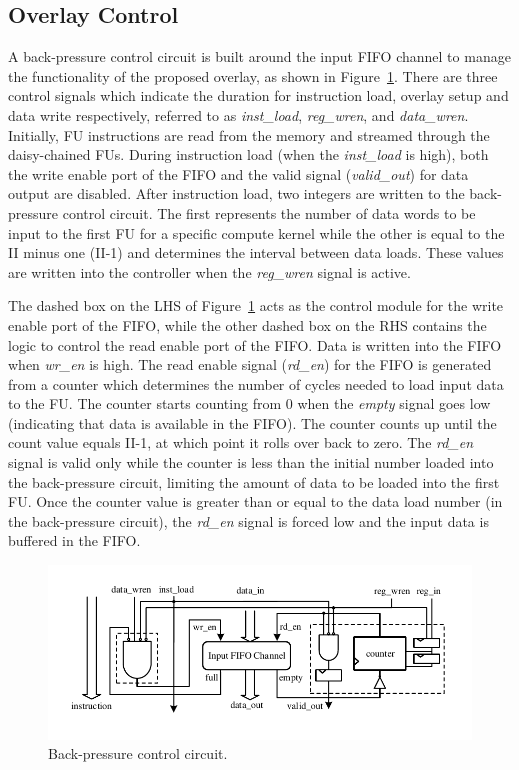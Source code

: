 \subsection{Overlay Control}
A back-pressure control circuit is built around the input FIFO channel to manage the functionality of the proposed overlay, as shown in Figure~\ref{back_pressure}. 
There are three control signals which indicate the duration for instruction load, overlay setup and data write respectively, referred to as \textit{inst\_load}, \textit{reg\_wren}, and \textit{data\_wren}. 
Initially, FU instructions are read from the memory and streamed through the daisy-chained FUs. 
During instruction load (when the \textit{inst\_load} is high), both the write enable port of the FIFO and the valid signal (\textit{valid\_out}) for data output are disabled. 
After instruction load, two integers are written to the back-pressure control circuit. 
The first represents the number of data words to be input to the first FU for a specific compute kernel while the other is equal to the II minus one (II-1) and determines the interval between data loads. 
These values are written into the controller when the \textit{reg\_wren} signal is active.

The dashed box on the LHS of Figure~\ref{back_pressure} acts as the control module for the write enable port of the FIFO, while the other dashed box on the RHS contains the logic to control the read enable port of the FIFO. 
Data is written into the FIFO when \textit{wr\_en} is high.
The read enable signal (\textit{rd\_en}) for the FIFO is generated from a counter which determines the number of cycles needed to load input data to the FU. 
The counter starts counting from 0 when the \textit{empty} signal goes low (indicating that data is available in the FIFO). The counter counts up until the count value equals II-1, at which point it rolls over back to zero.   
The \textit{rd\_en} signal is valid only while the counter is less than the initial number loaded into the back-pressure circuit, limiting the amount of data to be loaded into the first FU.
Once the counter value is greater than or equal to the data load number (in the back-pressure circuit), the \textit{rd\_en} signal is forced low and the input data is buffered in the FIFO.


\begin{figure}
	\centering
	\includegraphics[width=\columnwidth]{Figures/control.pdf}
	\caption{Back-pressure control circuit.}
	\label{back_pressure}
\end{figure}
	

